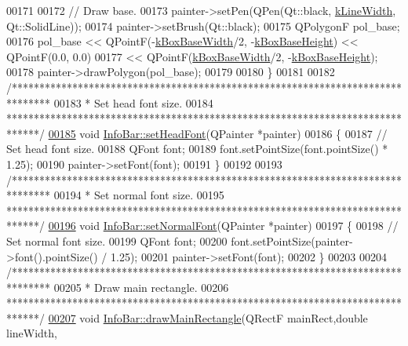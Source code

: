 \begin{DoxyCode}
00171 
00172   \textcolor{comment}{// Draw base.}
00173   painter->setPen(QPen(Qt::black, \hyperlink{class_info_bar_a9592abdb63cc3cfffc6e5826f998a353}{kLineWidth}, Qt::SolidLine));
00174   painter->setBrush(Qt::black);
00175   QPolygonF pol\_base;
00176   pol\_base << QPointF(-\hyperlink{class_info_bar_a3eb5cc879199e1a927ed76eb989c4c0e}{kBoxBaseWidth}/2, -\hyperlink{class_info_bar_a0f2f7b614000ae1d317ec3819acabbf2}{kBoxBaseHeight}) << QPointF(0.0, 0.0)
00177            << QPointF(\hyperlink{class_info_bar_a3eb5cc879199e1a927ed76eb989c4c0e}{kBoxBaseWidth}/2, -\hyperlink{class_info_bar_a0f2f7b614000ae1d317ec3819acabbf2}{kBoxBaseHeight});
00178   painter->drawPolygon(pol\_base);
00179 
00180 \}
00181 
00182 \textcolor{comment}{/*******************************************************************************}
00183 \textcolor{comment}{ * Set head font size.}
00184 \textcolor{comment}{ ******************************************************************************/}
\hypertarget{infobar_8cpp_source_l00185}{}\hyperlink{class_info_bar_a9d49c5f446e209ac2a99f48991040745}{00185} \textcolor{keywordtype}{void} \hyperlink{class_info_bar_a9d49c5f446e209ac2a99f48991040745}{InfoBar::setHeadFont}(QPainter *painter)
00186 \{
00187   \textcolor{comment}{// Set head font size.}
00188   QFont font;
00189   font.setPointSize(font.pointSize() * 1.25);
00190   painter->setFont(font);
00191 \}
00192 
00193 \textcolor{comment}{/*******************************************************************************}
00194 \textcolor{comment}{ * Set normal font size.}
00195 \textcolor{comment}{ ******************************************************************************/}
\hypertarget{infobar_8cpp_source_l00196}{}\hyperlink{class_info_bar_a2bfda27ec3d1ae6b4b1c927876f594c1}{00196} \textcolor{keywordtype}{void} \hyperlink{class_info_bar_a2bfda27ec3d1ae6b4b1c927876f594c1}{InfoBar::setNormalFont}(QPainter *painter)
00197 \{
00198   \textcolor{comment}{// Set normal font size.}
00199   QFont font;
00200   font.setPointSize(painter->font().pointSize() / 1.25);
00201   painter->setFont(font);
00202 \}
00203 
00204 \textcolor{comment}{/*******************************************************************************}
00205 \textcolor{comment}{ * Draw main rectangle.}
00206 \textcolor{comment}{ ******************************************************************************/}
\hypertarget{infobar_8cpp_source_l00207}{}\hyperlink{class_info_bar_a5d5440d1ca77a5366e51ac9e6f6aa4d3}{00207} \textcolor{keywordtype}{void} \hyperlink{class_info_bar_a5d5440d1ca77a5366e51ac9e6f6aa4d3}{InfoBar::drawMainRectangle}(QRectF mainRect,\textcolor{keywordtype}{double} lineWidth,

\end{DoxyCode}
